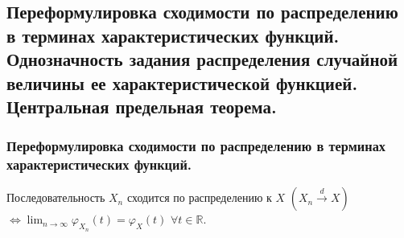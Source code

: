 \subsection{Переформулировка сходимости по распределению в терминах характеристических функций. Однозначность задания распределения случайной величины ее характеристической функцией. Центральная предельная теорема.}

\subsubsection{Переформулировка сходимости по распределению в терминах характеристических функций.}

\begin{theorem*}
    Последовательность $X_n$ сходится по распределению к $X$ $(X_n \xrightarrow{d} X)$ $\Leftrightarrow \lim_{n \to \infty} \varphi_{X_n}(t) = \varphi_{X}(t)$ $\forall t \in \mathbb{R}$.
\end{theorem*}

